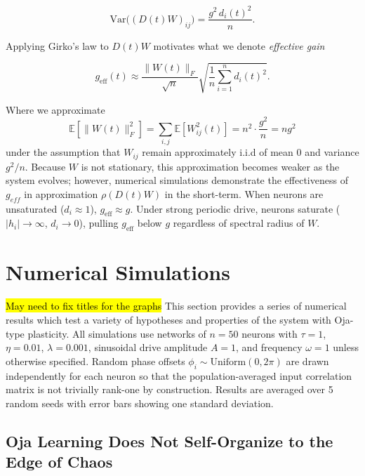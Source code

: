 \documentclass[paper=a4, fontsize=11pt]{scrartcl} %
\numberwithin{equation}{section} %
\numberwithin{figure}{section} %
\numberwithin{table}{section} %
\begin{document}
\begin{equation}
    \mathrm{Var}\bigl((D(t)W)_{ij}\bigr) = \frac{g^2\,d_i(t)^2}{n}.
\end{equation}

Applying Girko's law to $D(t)W$ motivates what we denote
\textit{effective gain}

\begin{equation}
    g_{\mathrm{eff}}(t) \approx \frac{\|W(t)\|_F}{\sqrt{n}}\sqrt{\frac{1}{n}\sum_{i=1}^n d_i(t)^2}.
    \label{eq:geff}
\end{equation}

 Where we approximate
 \[
 \mathbb{E}[\|W(t)\|^2_F] = \sum_{i,j}\mathbb{E}[W_{ij}^2(t)] = n^2 \cdot \frac{g^2}{n} = ng^2
 \]
 under the assumption that $W_{ij}$ remain approximately i.i.d of mean $0$ and variance $g^2/n$. Because $W$ is not stationary, this approximation becomes weaker as the system evolves;  however, numerical simulations demonstrate the effectiveness of $g_{eff}$ in approximation $\rho(D(t)W)$ in the short-term. When neurons are
unsaturated ($d_i \approx 1$), $g_{\mathrm{eff}} \approx g$. Under strong periodic
drive, neurons saturate ($|h_i| \to \infty$, $d_i \to 0$), pulling $g_{\mathrm{eff}}$
below $g$ regardless of spectral radius of $W$. 

\section{Numerical Simulations}
\hl{May need to fix titles for the graphs}
This section provides a series of numerical results which test a variety of hypotheses and properties of the system with Oja-type plasticity. All simulations use networks of $n = 50$ neurons with $\tau = 1$, $\eta = 0.01$,
$\lambda = 0.001$, sinusoidal drive amplitude $A = 1$, and frequency $\omega = 1$
unless otherwise specified.  Random phase offsets $\phi_i \sim \mathrm{Uniform}(0,2\pi)$
are drawn independently for each neuron so that the population-averaged input
correlation matrix is not trivially rank-one by construction.  Results are averaged
over 5 random seeds with error bars showing one standard deviation.

\subsection{Oja Learning Does Not Self-Organize to the Edge of Chaos}
\end{document}
